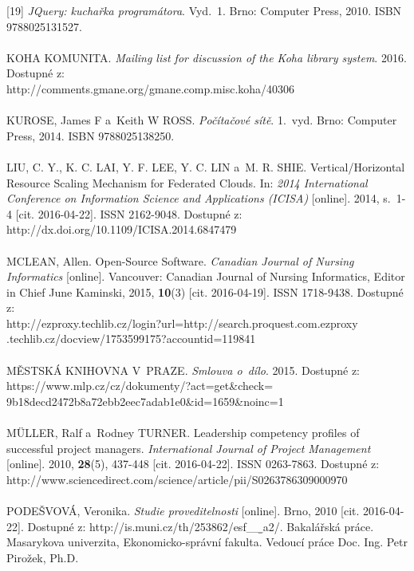 \documentclass[
	11pt, oneside, printed, final, palatino
	microtype,
	table,   %
	lof,     %
	lot     %
]{fithesis3}
\begin{document}
{[19] \textit{JQuery: kuchařka programátora}. Vyd.~1. Brno: Computer Press, 2010. ISBN 9788025131527.
~\\ ~\\ \noindent
[20] KOHA KOMUNITA. \textit{Mailing list for discussion of the Koha library system}. 2016. Dostupné z: \\http://comments.gmane.org/gmane.comp.misc.koha/40306
~\\ ~\\ \noindent
[21] KUROSE, James F a~Keith W ROSS. \textit{Počítačové sítě}. 1.~vyd. Brno: Computer Press, 2014. ISBN 9788025138250.
~\\ ~\\ \noindent
[22] LIU, C. Y., K. C. LAI, Y. F. LEE, Y. C. LIN a~M. R. SHIE. Vertical/Horizontal Resource Scaling Mechanism for Federated Clouds. In: \textit{2014 International Conference on Information Science and Applications (ICISA)} [online]. 2014, s.~1-4 [cit. 2016-04-22]. ISSN 2162-9048. Dostupné z: \\http://dx.doi.org/10.1109/ICISA.2014.6847479
~\\ ~\\ \noindent
[23] MCLEAN, Allen. Open-Source Software. \textit{Canadian Journal of Nursing Informatics} [online]. Vancouver: Canadian Journal of Nursing Informatics, Editor in Chief June Kaminski, 2015, \textbf{10}(3) [cit. 2016-04-19]. ISSN 1718-9438. Dostupné z:\\ http://ezproxy.techlib.cz/login?url=http://search.proquest.com.ezproxy\\.techlib.cz/docview/1753599175?accountid=119841
~\\ ~\\ \noindent
[24] MĚSTSKÁ KNIHOVNA V~PRAZE. \textit{Smlouva o~dílo}. 2015. Dostupné z:\\ https://www.mlp.cz/cz/dokumenty/?act=get\&check=\\9b18decd2472b8a72ebb2eec7adab1e0\&id=1659\&noinc=1
~\\ ~\\ \noindent
[25] MÜLLER, Ralf a~Rodney TURNER. Leadership competency profiles of successful project managers. \textit{International Journal of Project Management} [online]. 2010, 	\textbf{28}(5), 437-448 [cit. 2016-04-22]. ISSN 0263-7863. Dostupné z: http://www.sciencedirect.com/science/article/pii/S0263786309000970
~\\ ~\\ \noindent
[26] PODEŠVOVÁ, Veronika. \textit{Studie proveditelnosti} [online]. Brno, 2010 [cit. 2016-04-22]. Dostupné z: http://is.muni.cz/th/253862/esf\_\b\_a2/. Bakalářská práce. Masarykova univerzita, Ekonomicko-správní fakulta. Vedoucí práce Doc. Ing. Petr Pirožek, Ph.D.
}
\end{document}
